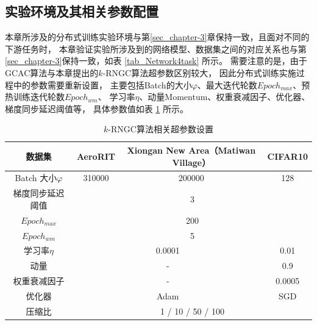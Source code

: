 \documentclass{xdupgthesis}
\begin{document}
\subsection{实验环境及其相关参数配置}
本章所涉及的分布式训练实验环境与第\ref*{sec_chapter-3}章保持一致，且面对不同的下游任务时，
本章验证实验所涉及到的网络模型、数据集之间的对应关系也与第\ref*{sec_chapter-3}保持一致，如表 \ref*{tab_Network4task} 所示。
需要注意的是，由于GCAC算法与本章提出的$k$-RNGC算法超参数区别较大，
因此分布式训练实施过程中的参数需要重新设置，
主要包括Batch的大小$\varphi$、最大迭代轮数$Epoch_{max}$、预热训练迭代轮数$Epoch_{wm}$、
学习率$\eta$、动量Momentum、权重衰减因子、优化器、梯度同步延迟阈值等，
具体参数值如表 \ref*{tab_Network-Parameter-k-RNGC} 所示。
\renewcommand{\arraystretch}{1.3}
\begin{table}[ht]
    \centering
    \begin{threeparttable}
        \caption{$k$-RNGC算法相关超参数设置}
        \label{tab_Network-Parameter-k-RNGC}
        \begin{tabular}{c|c|c|c}
            \toprule
            \toprule
            数据集 & AeroRIT & Xiongan New Area（Matiwan Village） & CIFAR10 \\ 
            \midrule
            Batch 大小$\varphi$ & 310000 & 200000 & 128 \\ 
            \midrule
            梯度同步延迟阈值 & \multicolumn{3}{c}{3} \\
            \midrule
            $Epoch_{max}$ & \multicolumn{3}{c}{200} \\ 
            \midrule
            $Epoch_{wm}$ & \multicolumn{3}{c}{5} \\ 
            \midrule
            学习率$\eta$ & \multicolumn{2}{c|}{0.0001} & 0.01 \\ 
            \midrule
            动量 & \multicolumn{2}{c|}{-} & 0.9 \\ 
            \midrule
            权重衰减因子 & \multicolumn{2}{c|}{-} & 0.0005 \\ 
            \midrule
            优化器 & \multicolumn{2}{c|}{Adam} & SGD \\
            \midrule
            压缩比 & \multicolumn{3}{c}{ 1 / 10 / 50 / 100} \\
            \bottomrule
            \bottomrule
        \end{tabular}
    \end{threeparttable}
\end{table}
\end{document}
